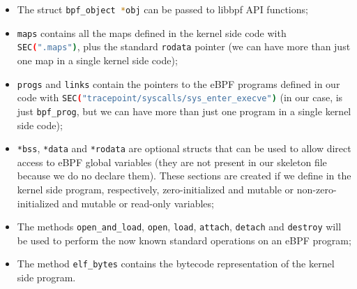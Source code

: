 \begin{itemize}
	\item 
		The struct \colorbox{backcolour}{\lstinline[style=commandline, language=bash, breaklines=true]|bpf_object *obj|} can be passed to libbpf API functions;
	\item 
		\colorbox{backcolour}{\lstinline[style=commandline, language=bash, breaklines=true]|maps|} contains all the maps defined in the kernel side code with \colorbox{backcolour}{\lstinline[style=commandline, language=bash, breaklines=true]|SEC(".maps")|}, plus the standard \colorbox{backcolour}{\lstinline[style=commandline, language=bash, breaklines=true]|rodata|} pointer (we can have more than just one map in a single kernel side code);
	\item 
		\colorbox{backcolour}{\lstinline[style=commandline, language=bash, breaklines=true]|progs|} and \colorbox{backcolour}{\lstinline[style=commandline, language=bash, breaklines=true]|links|} contain the pointers to the eBPF programs defined in our code with \colorbox{backcolour}{\lstinline[style=commandline, language=bash, breaklines=true]|SEC("tracepoint/syscalls/sys_enter_execve")|} (in our case, is just \colorbox{backcolour}{\lstinline[style=commandline, language=bash, breaklines=true]|bpf_prog|}, but we can have more than just one program in a single kernel side code);
	\item 
		\colorbox{backcolour}{\lstinline[style=commandline, language=bash, breaklines=true]|*bss|}, \colorbox{backcolour}{\lstinline[style=commandline, language=bash, breaklines=true]|*data|} and \colorbox{backcolour}{\lstinline[style=commandline, language=bash, breaklines=true]|*rodata|} are optional structs that can be used to allow direct access to eBPF global variables (they are not present in our skeleton file because we do no declare them).
		These sections are created if we define in the kernel side program, respectively, zero-initialized and mutable or non-zero-initialized and mutable or read-only variables;
	\item 
		The methods \colorbox{backcolour}{\lstinline[style=commandline, language=bash, breaklines=true]|open_and_load|}, \colorbox{backcolour}{\lstinline[style=commandline, language=bash, breaklines=true]|open|}, \colorbox{backcolour}{\lstinline[style=commandline, language=bash, breaklines=true]|load|}, \colorbox{backcolour}{\lstinline[style=commandline, language=bash, breaklines=true]|attach|}, \colorbox{backcolour}{\lstinline[style=commandline, language=bash, breaklines=true]|detach|} and \colorbox{backcolour}{\lstinline[style=commandline, language=bash, breaklines=true]|destroy|} will be used to perform the now known standard operations on an eBPF program;
	\item 
		The method \colorbox{backcolour}{\lstinline[style=commandline, language=bash, breaklines=true]|elf_bytes|} contains the bytecode representation of the kernel side program.
\end{itemize}

